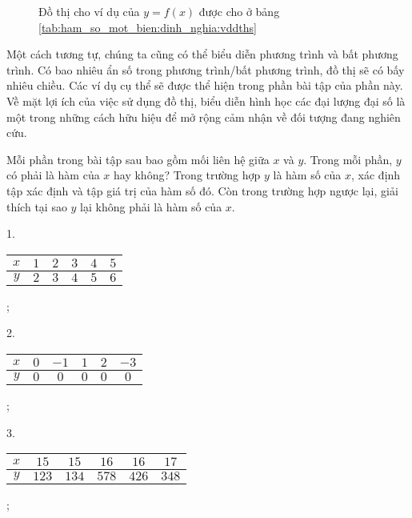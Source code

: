 \begin{figure}[h]
   \centering
   \caption{Đồ thị cho ví dụ của $y = f(x)$ được cho ở bảng \ref{tab:ham_so_mot_bien:dinh_nghia:vddths}}
   \label{fig:ham_so_mot_bien:dinh_nghia:vddths}
\end{figure}

Một cách tương tự, chúng ta cũng có thể biểu diễn phương trình và bất phương trình. Có bao nhiêu ẩn số trong phương trình/bất phương trình, đồ thị sẽ có bấy nhiêu chiều. Các ví dụ cụ thể sẽ được thể hiện trong phần bài tập của phần này. Về mặt lợi ích của việc sử dụng đồ thị, biểu diễn hình học các đại lượng đại số là một trong những cách hữu hiệu để mở rộng cảm nhận về đối tượng đang nghiên cứu. 
      
\exercise Mỗi phần trong bài tập sau bao gồm mối liên hệ giữa $x$ và $y$. Trong mỗi phần, $y$ có phải là hàm của $x$ hay không? Trong trường hợp $y$ là hàm số của $x$, xác định tập xác định và tập giá trị của hàm số đó. Còn trong trường hợp ngược lại, giải thích tại sao $y$ lại không phải là hàm số của $x$.

1.
\begin{tabular}{|c|c|c|c|c|c|}
   \hline
   $x$ & $1$ & $2$ & $3$ & $4$ & $5$ \\
   \hline
   $y$ & $2$ & $3$ & $4$ & $5$ & $6$ \\
   \hline
\end{tabular};

2.
\begin{tabular}{|c|c|c|c|c|c|}
   \hline
   $x$ & $0$ & $-1$ & $1$ & $2$ & $-3$ \\
   \hline
   $y$ & $0$ & $0$ & $0$ & $0$ & $0$ \\
   \hline
\end{tabular};

3.
\begin{tabular}{|c|c|c|c|c|c|}
   \hline
   $x$ & $15$ & $15$ & $16$ & $16$ & $17$ \\
   \hline
   $y$ & $123$ & $134$ & $578$ & $426$ & $348$ \\
   \hline
\end{tabular};

